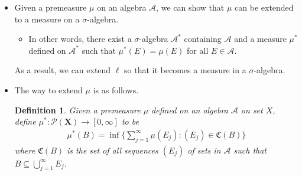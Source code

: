 \documentclass[10pt]{article}
\newtheorem{definition}[lemma]{Definition}
\newcommand{\ve}[1]{\mathbf{#1}}
\newcommand{\mcal}[1]{\mathcal{#1}}
\begin{document}
\begin{itemize}
\begin{proof}
    For the other direction, let $\varepsilon > 0$ be arbitrary. Let $(\varepsilon_j)$ be a sequence of positive numbers with $\sum \epsilon_j < \varepsilon / 2$. Consider the interval $I_j = (a_j - \varepsilon_j, b_k + \varepsilon_j)$. The collection $\{I_j\}$ of open sets is a cover of the interval $[a,b]$. Since $[a,b]$ is compact, it has a finite subcover, say, $I_1$, $I_2$, $\dotsc$, $I_m$. By reordering and discarding some intervals, we may assume that
    \begin{align*}
      a_1 - \varepsilon_1 &< a \\
      b &< b_m + \varepsilon_m \\
      a_j - \varepsilon_j &< b_{j-1} + \varepsilon_{j-1}.
    \end{align*}
    If follows that
    \begin{align*}
      b - a 
      \leq (b_m + \varepsilon_m) - (a_1 - \varepsilon_1) 
      \leq \sum_{j=1}^m [(b_j + \varepsilon_j) - (a_j - \varepsilon_j) ]
      \leq \varepsilon + \sum_{j=1}^m (b_j - a_j) 
      \leq \varepsilon + \sum_{j=1}^\infty (b_j - a_j).
    \end{align*}
    Since $\epsilon > 0$ is arbitrary, it follows that
    \begin{align*}
      \ell((a,b]) \leq \sum_{i=1}^\infty \ell((a_i, b_i]).
    \end{align*}
    As a result, $\ell((a,b]) = \sum_{i=1}^\infty \ell((a_i, b_i])$.

    Combining the results of all cases, we can conclude that $\ell$ is countably additive in $\mcal{F}$.
  \end{proof}

  \item Given a premeasure $\mu$ on an algebra $\mcal{A}$, we can show that $\mu$ can be extended to a measure on a $\sigma$-algebra.
  \begin{itemize}
    \item In other words, there exist a $\sigma$-algebra $\mcal{A}^*$ containing $\mcal{A}$ and a measure $\mu^*$ defined on $\mcal{A}^*$ such that $\mu^*(E) = \mu(E)$ for all $E \in \mcal{A}$. 
  \end{itemize}
  As a result, we can extend $\ell$ so that it becomes a measure in a $\sigma$-algebra.

  \item The way to extend $\mu$ is as follows.
  \begin{definition}
    Given a premeasure $\mu$ defined on an algebra $\mcal{A}$ on set $X$, define $\mu^*: \mcal{P}(\ve{X}) \rightarrow [0,\infty]$ to be
    \begin{align*}
      \mu^*(B) = \inf \bigg\{ \sum_{j=1}^\infty \mu(E_j) : (E_j) \in \mathfrak{C}(B) \bigg\}
    \end{align*}
    where $\mathfrak{C}(B)$ is the set of all sequences $(E_j)$ of sets in $\mcal{A}$ such that $B \subseteq \bigcup_{j=1}^\infty E_j$.
  \end{definition}


\end{itemize}
\end{document}
